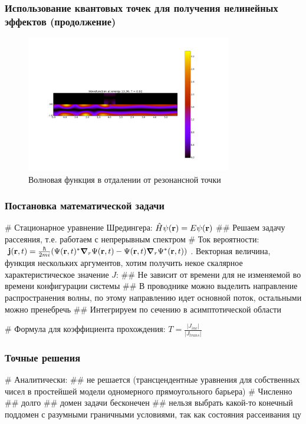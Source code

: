 \documentclass{beamer}
\begin{document}
\begin{frame}[fragile]
\frametitle{Использование квантовых точек для получения нелинейных эффектов (продолжение)}
\begin{figure}
\includegraphics[width=0.8\textwidth]{high-transmission.png}
\caption{Волновая функция в отдалении от резонансной точки}
\end{figure}
\end{frame}



\begin{frame}[fragile]
\frametitle{Постановка математической задачи}
\begin{easylist}[itemize]
# Стационарное уравнение Шредингера: $\hat{H} \psi(\vb{r}) = E \psi(\vb{r})$
## Решаем задачу рассеяния, т.е. работаем с непрерывным спектром
# Ток вероятности: $\vb{j}(\vb{r}, t) = \frac{\hbar}{2 m i} (\Psi(\vb{r}, t)^* \grad_r{\Psi(\vb{r}, t)} - \Psi(\vb{r}, t) \grad_r{\Psi^*(\vb{r}, t))}$. Векторная величина, функция нескольких аргументов, хотим получить некое скалярное характеристическое значение $J$:
## Не зависит от времени для не изменяемой во времени конфигурации системы
## В проводнике можно выделить направление распространения волны, по этому направлению идет основной поток, остальными можно пренебречь
## Интегрируем по сечению в асимптотической области

# Формула для коэффициента прохождения: $T = \frac{|J_{inc}|}{|J_{trans}|}$
\end{easylist}
\end{frame}


\begin{frame}[fragile]
\frametitle{Точные решения}
\begin{easylist}[itemize]
# Аналитически:
## не решается (трансцендентные уравнения для собственных чисел в простейшей модели одномерного прямоугольного барьера)
# Численно
## долго
## домен задачи бесконечен
## нельзя выбрать какой-то конечный поддомен с разумными граничными условиями, так как состояния рассеивания цу
\end{easylist}
\end{frame}
\end{document}
